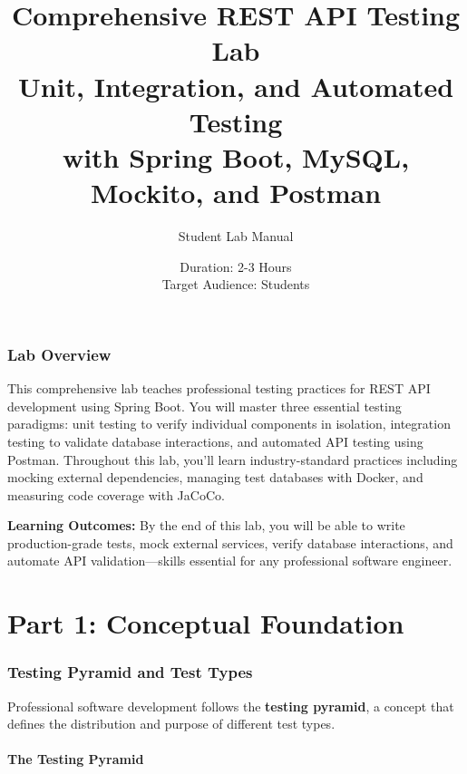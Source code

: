\documentclass[12pt,a4paper]{article}
\title{\Huge Comprehensive REST API Testing Lab \\
       \Large Unit, Integration, and Automated Testing \\
       \large with Spring Boot, MySQL, Mockito, and Postman}
\author{Student Lab Manual}
\date{Duration: 2-3 Hours \\ Target Audience: Students}
\begin{document}
\maketitle

\newpage

\tableofcontents

\newpage

\section*{Lab Overview}

This comprehensive lab teaches professional testing practices for REST API development using Spring Boot. You will master three essential testing paradigms: unit testing to verify individual components in isolation, integration testing to validate database interactions, and automated API testing using Postman. Throughout this lab, you'll learn industry-standard practices including mocking external dependencies, managing test databases with Docker, and measuring code coverage with JaCoCo.

\textbf{Learning Outcomes:} By the end of this lab, you will be able to write production-grade tests, mock external services, verify database interactions, and automate API validation—skills essential for any professional software engineer.

\newpage

\part{Part 1: Conceptual Foundation}

\section{Testing Pyramid and Test Types}

Professional software development follows the \textbf{testing pyramid}, a concept that defines the distribution and purpose of different test types.

\subsection{The Testing Pyramid}
\end{document}
